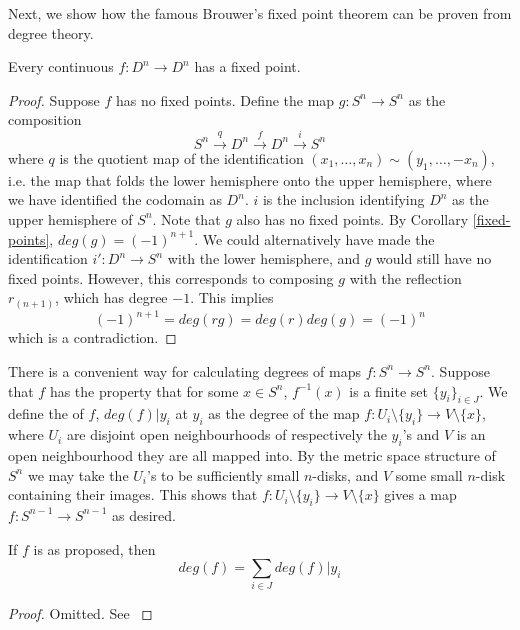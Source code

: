 Next, we show how the famous Brouwer's fixed point theorem can be proven from degree theory.

\begin{theorem}
Every continuous $f:D^n\rightarrow D^n$ has a fixed point.
\end{theorem}
\begin{proof}
Suppose $f$ has no fixed points. Define the map $g:S^n\rightarrow S^n$ as the composition 
$$S^n\xrightarrow{q}D^n\xrightarrow{f}D^n\xrightarrow{i}S^n$$
where $q$ is the quotient map of the identification $(x_1,\dots,x_n)\sim (y_1,\dots,-x_n)$, i.e. the map that folds the lower hemisphere onto the upper hemisphere, where we have identified the codomain as $D^n$. $i$ is the inclusion identifying $D^n$ as the upper hemisphere of $S^n$. Note that $g$ also has no fixed points. By Corollary \ref{fixed-points}, $deg(g)=(-1)^{n+1}$. We could alternatively have made the identification $i':D^n\rightarrow S^n$ with the lower hemisphere, and $g$ would still have no fixed points. However, this corresponds to composing $g$ with the reflection $r_{(n+1)}$, which has degree $-1$. This implies
$$(-1)^{n+1}=deg(rg)=deg(r)deg(g)=(-1)^{n}$$
which is a contradiction.
\end{proof}


There is a convenient way for calculating degrees of maps $f:S^n\rightarrow S^n$. Suppose that $f$ has the property that for some $x\in S^n$, $f^{-1}(x)$ is a finite set $\{y_i\}_{i\in J}$. We define the  of $f$, $deg(f)|{y_i}$ at $y_i$ as the degree of the map $f:U_i\setminus \{y_i\}\rightarrow V\setminus\{x\}$, where $U_i$ are disjoint open neighbourhoods of respectively the $y_i$'s and $V$ is an open neighbourhood they are all mapped into. By the metric space structure of $S^n$ we may take the $U_i$'s to be sufficiently small $n$-disks, and $V$ some small $n$-disk containing their images. This shows that $f:U_i\setminus \{y_i\}\rightarrow V\setminus\{x\}$ gives a map $f:S^{n-1}\rightarrow S^{n-1}$ as desired.

\begin{proposition}
If $f$ is as proposed, then $$deg(f)=\sum_{i\in J}deg(f)|{y_i}$$
\end{proposition}
\begin{proof}
Omitted. See \cite{Hatcher}
\end{proof}